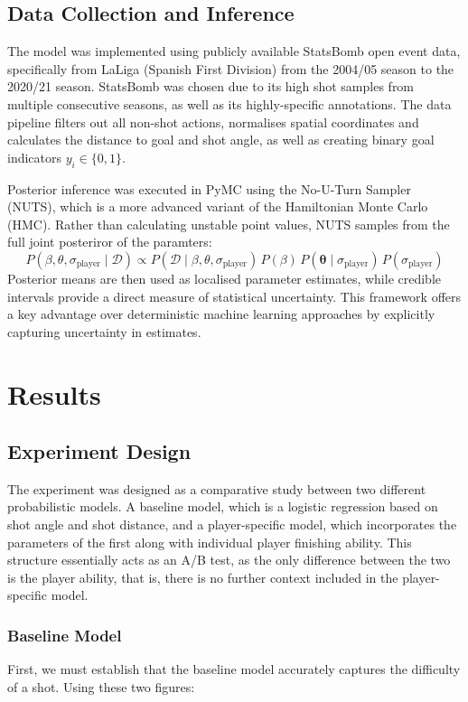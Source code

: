 \documentclass{article}
\begin{document}
\subsection{Data Collection and Inference}
The model was implemented using publicly available StatsBomb open event data, specifically from LaLiga (Spanish First Division) from the 2004/05 season to the 2020/21 season. StatsBomb was chosen due to its high shot samples from multiple consecutive seasons, as well as its highly-specific annotations. The data pipeline filters out all non-shot actions, normalises spatial coordinates and calculates the distance to goal and shot angle, as well as creating binary goal indicators $y_i \in \{0, 1\}$.

Posterior inference was executed in PyMC using the No-U-Turn Sampler (NUTS), which is a more advanced variant of the Hamiltonian Monte Carlo (HMC). Rather than calculating unstable point values, NUTS samples from the full joint posteriror of the paramters:
\begin{equation}
    P(\beta, \theta, \sigma_{\text{player}} \mid \mathcal{D}) \propto P(\mathcal{D} \mid \beta, \theta, \sigma_{\text{player}}) \, P(\beta) \, P(\mathbf{\theta} \mid \sigma_{\text{player}}) \, P(\sigma_{\text{player}})
\end{equation}
Posterior means are then used as localised parameter estimates, while credible intervals provide a direct measure of statistical uncertainty. This framework offers a key advantage over deterministic machine learning approaches by explicitly capturing uncertainty in estimates.

\section{Results}
\subsection{Experiment Design}
The experiment was designed as a comparative study between two different probabilistic models. A baseline model, which is a logistic regression based on shot angle and shot distance, and a player-specific model, which incorporates the parameters of the first along with individual player finishing ability. This structure essentially acts as an A/B test, as the only difference between the two is the player ability, that is, there is no further context included in the player-specific model.
\subsubsection{Baseline Model}
First, we must establish that the baseline model accurately captures the difficulty of a shot. Using these two figures:
\end{document}
